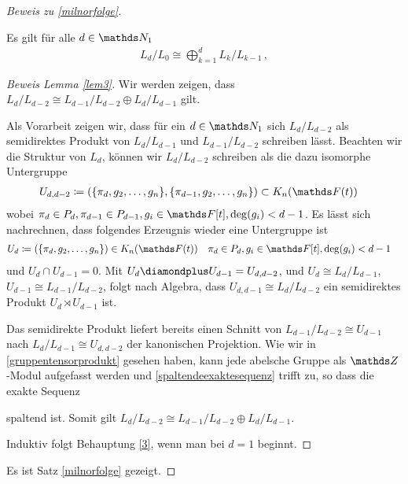 \documentclass[ngerman,fontsize=11pt, paper=a4, parskip=half, titlepage=true, toc=bib]{scrartcl}
\begin{document}
\begin{proof}[Beweis zu \ref{milnorfolge}]
  \begin{Lem}\label{lem3}
    Es gilt für alle $d\in\N_1$
    \begin{gather}
      L_d/L_0\cong \bigoplus_{k=1}^d L_k/L_{k-1} \,,
    \end{gather}
  \end{Lem}
  \begin{proof}[Beweis Lemma \ref{lem3}]
    Wir werden zeigen, dass $L_d/L_{d-2}\cong L_{d-1}/L_{d-2}\oplus
    L_{d}/L_{d-1}$ gilt.
    
    Als Vorarbeit zeigen wir, dass für ein $d\in\N_1$ sich
    $L_d/L_{d-2}$ als semidirektes Produkt von $L_d/L_{d-1}$ und
    $L_{d-1}/L_{d-2}$ schreiben lässt.
    Beachten wir die Struktur von $L_d$, können wir $L_d/L_{d-2}$
    schreiben als die dazu isomorphe Untergruppe 
    \begin{align*}
      U_{d,{d-2}}
      &\coloneqq \left(
        \{\pi_d,g_2,\dotsc,g_n\},
        \{\pi_{d-1},g_2,\dotsc,g_n\}
        \right)\subset\KnFt
    \end{align*}
    wobei $\pi_{d}\in P_d, \pi_{d-1}\in P_{d-1}, 
    g_i\in\F[t],\deg(g_i)<d-1$.
    Es lässt sich nachrechnen, dass folgendes Erzeugnis wieder eine
    Untergruppe ist
    \begin{align*}
      U_d&\coloneqq \left(\{\pi_d,g_2,\dotsc,g_n\}\right)\in\KnFt
      &&\pi_{d}\in P_d, g_i\in\F[t],\deg(g_i)<d-1
    \end{align*}
    und $U_d\cap U_{d-1}=0$.
    Mit $U_d\p U_{d-1}= U_{d,d-2}$,
    und $U_d\cong L_d/L_{d-1}$, $U_{d-1}\cong L_{d-1}/L_{d-2}$,
    folgt nach Algebra, dass
    $U_{d,d-1}\cong L_d/L_{d-2}$ ein semidirektes Produkt $U_d\rtimes U_{d-1}$
    ist.

    Das semidirekte Produkt liefert bereits einen Schnitt von
    $L_{d-1}/L_{d-2}\cong U_{d-1}$ nach $L_d/L_{d-1}\cong U_{d,d-2}$
    der kanonischen Projektion.
    Wie wir in \ref{gruppentensorprodukt} gesehen haben, kann jede
    abelsche Gruppe als $\Z$-Modul aufgefasst werden und \ref{spaltendeexaktesequenz}
    trifft zu, so dass die exakte Sequenz
    \begin{center}
    \end{center}
    spaltend ist. Somit gilt $L_d/L_{d-2}\cong L_{d-1}/L_{d-2}\oplus
    L_d/L_{d-1}$.
    
    Induktiv folgt Behauptung \eqref{3}, wenn man bei $d=1$ beginnt.
  \end{proof}
  
  Es ist Satz \ref{milnorfolge} gezeigt.
\end{proof}


\printindex

\nocite{*}
\printbibliography
\end{document}
